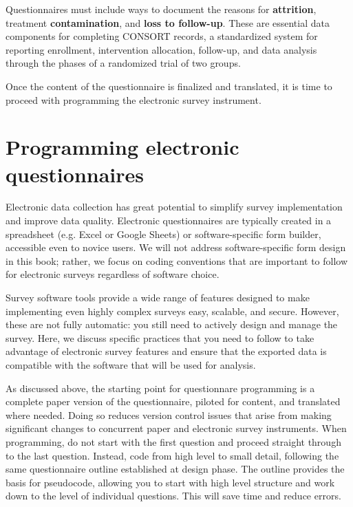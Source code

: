 Questionnaires must include ways to document the reasons for \textbf{attrition}, treatment \textbf{contamination}, and \textbf{loss to follow-up}.
These are essential data components for completing CONSORT records, a standardized system for reporting enrollment, intervention allocation, follow-up, and data analysis through the phases of a randomized trial of two groups.\cite{begg1996improving}

Once the content of the questionnaire is finalized and translated, it is time to proceed with programming the electronic survey instrument.


\section{Programming electronic questionnaires}
Electronic data collection has great potential to simplify survey implementation and improve data quality.
Electronic questionnaires are typically created in a spreadsheet (e.g. Excel or Google Sheets) or software-specific form builder, accessible even to novice users.
We will not address software-specific form design in this book; rather, we focus on coding conventions that are important to follow for electronic surveys regardless of software choice.

Survey software tools provide a wide range of features designed to make implementing even highly complex surveys easy, scalable, and secure.
However, these are not fully automatic: you still need to actively design and manage the survey.
Here, we discuss specific practices that you need to follow to take advantage of electronic survey features and ensure that the exported data is compatible with the software that will be used for analysis.


As discussed above, the starting point for questionnare programming is a complete paper version of the questionnaire, piloted for content, and translated where needed.
Doing so reduces version control issues that arise from making significant changes to concurrent paper and electronic survey instruments.
When programming, do not start with the first question and proceed straight through to the last question.
Instead, code from high level to small detail, following the same questionnaire outline established at design phase.
The outline provides the basis for pseudocode, allowing you to start with high level structure and work down to the level of individual questions. This will save time and reduce errors.


